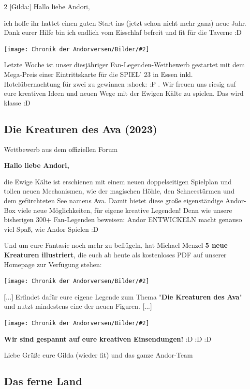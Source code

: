 \documentclass[10pt, a4paper, oneside]{book}
\newcommand{\fillbreak}{\vspace*{\fill}\columnbreak}
\newcommand{\produkt}[1]{%
    \section{#1}%
    \label{Produkt: #1}%
}
\newcommand{\bildmitts}[2][height=0.32\textwidth,width=0.48\textwidth,keepaspectratio]{%
    \begin{center}
        \texttt{[image: Chronik der Andorversen/Bilder/\#2]}
    \end{center}
}
\begin{document}
\begin{multicols}{2}
[Gilda:] Hallo liebe Andori,

ich hoffe ihr hattet einen guten Start ins (jetzt schon nicht mehr ganz) neue Jahr. Dank eurer Hilfe bin ich endlich vom Eisschlaf befreit und fit für die Taverne :D

\bildmitts{Gilda is back.jpeg}

Letzte Woche ist unser diesjähriger Fan-Legenden-Wettbewerb gestartet mit dem Mega-Preis einer Eintrittskarte für die SPIEL' 23 in Essen inkl. Hotelübernachtung für zwei zu gewinnen :shock: :P . Wir freuen uns riesig auf eure kreativen Ideen und neuen Wege mit der Ewigen Kälte zu spielen. Das wird klasse :D




\fillbreak
\produkt{Die Kreaturen des Ava (2023)}

\begin{center}
    Wettbewerb aus dem offiziellen Forum
\end{center}

\textbf{Hallo liebe Andori,}

die Ewige Kälte ist erschienen mit einem neuen doppelseitigen Spielplan und tollen neuen Mechanismen, wie der magischen Höhle, den Schneestürmen und dem gefürchteten See namens Ava. Damit bietet diese große eigenständige Andor-Box viele neue Möglichkeiten, für eigene kreative Legenden! Denn wie unsere bisherigen 300+ Fan-Legenden beweisen: Andor ENTWICKELN macht genauso viel Spaß, wie Andor Spielen :D

Und um eure Fantasie noch mehr zu beflügeln, hat Michael Menzel \textbf{5 neue Kreaturen illustriert}, die euch ab heute als kostenloses PDF auf unserer Homepage zur Verfügung stehen:

\bildmitts{Kreaturen des Ava.jpg}

[...] Erfindet dafür eure eigene Legende zum Thema "\textbf{Die Kreaturen des Ava}" und nutzt mindestens eine der neuen Figuren. [...]

\bildmitts{Die Kreaturen des Ava.jpeg}

\textbf{Wir sind gespannt auf eure kreativen Einsendungen!} :D :D :D

Liebe Grüße
eure Gilda (wieder fit) und das ganze Andor-Team






\begin{chapterbox}



\chapter{Das ferne Land}



\end{chapterbox}
\end{multicols}
\end{document}
